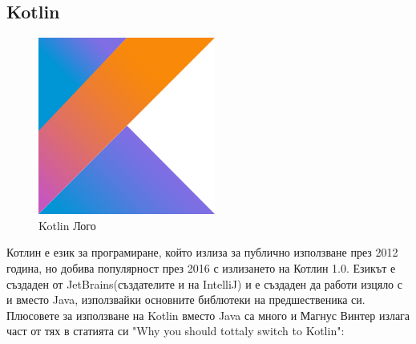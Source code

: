     \subsection{Kotlin}
    \begin{figure}[ht]
        \centering
        \includegraphics[scale=.4]{images/kotlin.png}
        \caption{Kotlin Лого}
        \label{fig:Kotlin}
    \end{figure}
    Котлин е език за програмиране, който излиза за публично използване през 2012 година, но добива популярност през 2016 с излизането на Котлин 1.0. Езикът е създаден от JetBrains(създателите и на IntelliJ) и е създаден да работи изцяло с и вместо Java, използвайки основните библютеки на предшественика си. Плюсовете за използване на Kotlin вместо Java са много и Магнус Винтер излага част от тях в статията си "Why you should tottaly switch to Kotlin"\parencite{Kotlin}:
